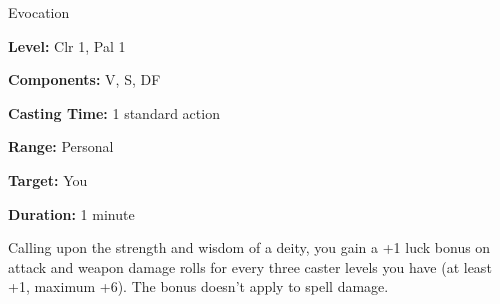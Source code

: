 
Evocation

\textbf{Level:} Clr 1, Pal 1

\textbf{Components:} V, S, DF

\textbf{Casting Time:} 1 standard action

\textbf{Range:} Personal

\textbf{Target:} You

\textbf{Duration:} 1 minute

Calling upon the strength and wisdom of a deity, you gain a +1 luck bonus on attack 
and weapon damage rolls for every three caster levels you have (at least +1, maximum 
+6). The bonus doesn't apply to spell damage.

